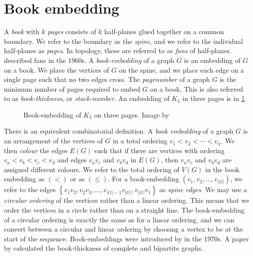 \section{Book embedding}\label{sec:Book Embedding}
A \textit{book} with \(k\) \textit{pages} consists of \(k\) half-planes glued together on a common boundary. We refer to the boundary as the \textit{spine}, and we refer to the individual half-planes as \textit{pages}. In topology, these are referred to as \textit{fans} of half-planes.\ \textcite{persingerSubsetsNbooksE31966,atneosenOnedimensionalNleavedContinua1972} described fans in the 1960s.
A \textit{book-embedding} of a graph \(G\) is an embedding of \(G\) on a book. We place the vertices of \(G\) on the spine, and we place each edge on a single page such that no two edges cross.
The \textit{pagenumber} of a graph \(G\) is the minimum number of pages required to embed \(G\) on a book. This is also referred to as \textit{book-thickness}, or \textit{stack-number}. An embedding of $K_5$ in three pages is in \cref{fig:book-embedding}.
\begin{figure}[h!]\label{fig:book-embedding}
	\centering
	
	\caption{Book-embedding of $K_5$ on three pages. Image by \textcite{eppsteinBookEmbedding2014}}
\end{figure}
\par
There is an equivalent combinatorial definition. A \textit{book embedding} of a graph \(G\) is an arrangement of the vertices of \(G\) in a total ordering \(v_1 < v_2 < \cdots < v_n\). We then \textit{colour} the edges \(E(G)\) such that if there are vertices with ordering \(v_a < v_b < v_c < v_d\) and edges \(v_a v_c\) and \(v_b v_d\) in $E(G)$, then $v_a v_c$ and $v_b v_d$ are assigned different colours.
We refer to the total ordering of \(V(G)\) in the book embedding as \((<)\) or as \((\leq)\). For a book-embedding \((v_1, v_2, \ldots, v_{|G|})\), we refer to the edges \( \left\{ v_1 v_2, v_2 v_3, \ldots, v_{|G| - 1}v_{|G|}, v_{|G|}v_{1} \right\} \) as \textit{spine edges}.
We may use a \textit{circular ordering} of the vertices rather than a linear ordering. This means that we order the vertices in a circle rather than on a straight line. The book-embedding of a circular ordering is exactly the same as for a linear ordering, and we can convert between a circular and linear ordering by choosing a vertex to be at the start of the sequence.
Book-embeddings were introduced by \textcite{kainenRecentResultsTopological1974, ollmannBookThicknessVarious1973} in the 1970s. A paper by \textcite{bernhartBookThicknessGraph1979} calculated the book-thickness of complete and bipartite graphs.
